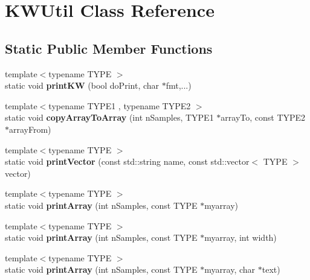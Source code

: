\hypertarget{class_k_w_util}{\section{K\-W\-Util Class Reference}
\label{class_k_w_util}
}
\subsection*{Static Public Member Functions}
\begin{DoxyCompactItemize}
\item 
\hypertarget{class_k_w_util_a5d14be8edc626d6b30b31c8d85c64d00}{{\footnotesize template$<$typename T\-Y\-P\-E $>$ }\\static void {\bfseries print\-K\-W} (bool do\-Print, char $\ast$fmt,...)}\label{class_k_w_util_a5d14be8edc626d6b30b31c8d85c64d00}

\item 
\hypertarget{class_k_w_util_a74cbba48bf115ff4ddb90e4c8abfaaac}{{\footnotesize template$<$typename T\-Y\-P\-E1 , typename T\-Y\-P\-E2 $>$ }\\static void {\bfseries copy\-Array\-To\-Array} (int n\-Samples, T\-Y\-P\-E1 $\ast$array\-To, const T\-Y\-P\-E2 $\ast$array\-From)}\label{class_k_w_util_a74cbba48bf115ff4ddb90e4c8abfaaac}

\item 
\hypertarget{class_k_w_util_aea07ca36b5b4f986426f2c03d7a84b6e}{{\footnotesize template$<$typename T\-Y\-P\-E $>$ }\\static void {\bfseries print\-Vector} (const std\-::string name, const std\-::vector$<$ T\-Y\-P\-E $>$ vector)}\label{class_k_w_util_aea07ca36b5b4f986426f2c03d7a84b6e}

\item 
\hypertarget{class_k_w_util_a9a809d578ed4b3647b7a92a8ee349a0e}{{\footnotesize template$<$typename T\-Y\-P\-E $>$ }\\static void {\bfseries print\-Array} (int n\-Samples, const T\-Y\-P\-E $\ast$myarray)}\label{class_k_w_util_a9a809d578ed4b3647b7a92a8ee349a0e}

\item 
\hypertarget{class_k_w_util_a43228ea0afd7071af2d990ee550472e0}{{\footnotesize template$<$typename T\-Y\-P\-E $>$ }\\static void {\bfseries print\-Array} (int n\-Samples, const T\-Y\-P\-E $\ast$myarray, int width)}\label{class_k_w_util_a43228ea0afd7071af2d990ee550472e0}

\item 
\hypertarget{class_k_w_util_aa537bb86732154b9ad1317e851afccfd}{{\footnotesize template$<$typename T\-Y\-P\-E $>$ }\\static void {\bfseries print\-Array} (int n\-Samples, const T\-Y\-P\-E $\ast$myarray, char $\ast$text)}\label{class_k_w_util_aa537bb86732154b9ad1317e851afccfd}


\end{DoxyCompactItemize}

